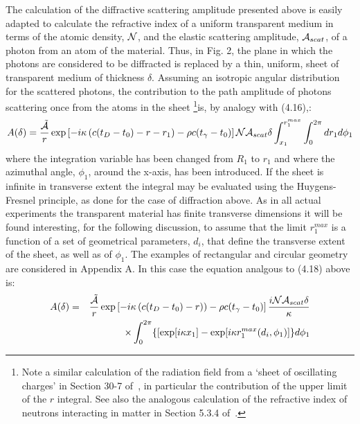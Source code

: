 {  \par The calculation of the diffractive scattering amplitude presented above is easily adapted
   to calculate the refractive index of a uniform transparent medium in terms of the atomic
   density, ${\cal N}$, and the elastic scattering amplitude, ${\cal A}_ {scat}$, of a photon from
    an atom of the 
   material. Thus, in Fig. 2, the plane in which the photons are considered to be diffracted is 
   replaced by a thin, uniform, sheet of transparent medium of thickness $\delta$. Assuming an
   isotropic angular distribution for the scattered photons, the contribution to the path amplitude
    of photons scattering once from the atoms in the sheet
    \footnote{Note a similar calculation of the radiation field from a `sheet of oscillating
     charges' in Section 30-7 of~\cite{Feyn2}, in particular the contribution of the upper
    limit of the $r$ integral. See also the analogous calculation of the refractive index of neutrons
 interacting in matter in Section 5.3.4 of~\cite{LLFB}.}is, by analogy with (4.16),:
   \begin{equation}
  A(\delta) =  \frac{\tilde{{\cal A}}}{r}\exp\left[ - i \kappa \left(c(t_D-t_0)- r - r_1
   \right)-\rho c(t_{\gamma}-t_0)\right] {\cal N} {\cal A}_{scat} \delta
    \int_{x_1}^{r_1^{max}} \int_0^{2 \pi}  d r_1  d\phi_1
\end{equation}
   where the integration variable has been changed from $R_1$ to $r_1$ and where the azimuthal
   angle, $\phi_1$, around the x-axis, has been introduced. If the sheet is infinite in 
   transverse extent the integral may be evaluated using the Huygens-Fresnel principle, as done
   for the case of diffraction above. As in all actual experiments the transparent material
   has finite transverse dimensions it will be found interesting, for the following discussion,
   to assume that the limit $r_1^{max}$ is a function of a set of geometrical parameters, $d_i$,
   that define the transverse extent of the sheet, as well as of $\phi_1$. The examples of
   rectangular and circular geometry are considered in Appendix A. In this case the equation
   analgous to (4.18) above is:
   \begin{eqnarray}
 A(\delta) & = & \frac{\tilde{{\cal A}}}{r}\exp\left[ - i\kappa \left(c(t_D-t_0)- r)
   \right)-\rho c (t_{\gamma}-t_0)\right]\frac{i{\cal N} {\cal A}_{scat} \delta}{\kappa} \nonumber \\ 
      &   & \times \int_0^{2 \pi}\{ \left[ \exp[i \kappa x_1]- \exp[i\kappa
    r_1^{max}(d_i,\phi_1) \right]\} d\phi_1  \nonumber \\

\end{eqnarray}}
